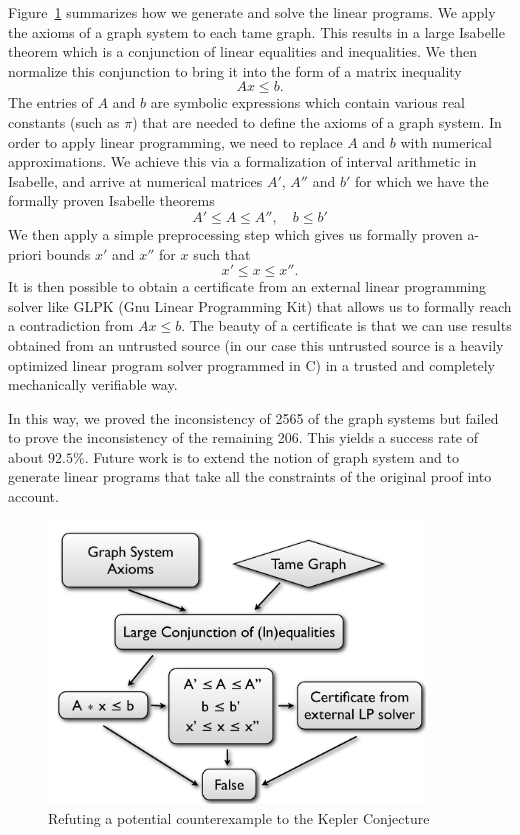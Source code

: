 \documentclass[11pt]{amsart}
\begin{document}
Figure~\ref{fig:lpapproach} summarizes how we generate and solve the linear programs.
We apply the axioms of a graph system to each tame graph. This results in a large Isabelle theorem which is a conjunction of
linear equalities and inequalities. We then normalize this conjunction
to bring it into the form of a matrix inequality
\begin{equation}
A  x \leq b.
\end{equation}
The entries of $A$ and $b$ are symbolic expressions which contain various real constants (such as $\pi$) that are needed to
define the axioms of a graph system. In order to apply linear programming, 
we need to replace $A$ and $b$ with numerical approximations. We achieve this via a formalization of 
interval arithmetic in Isabelle, and arrive at numerical matrices $A'$, $A''$ and $b'$ for which we have the formally proven 
Isabelle theorems 
\begin{equation}
A' \leq  A  \leq A'', \quad b \leq b'
\end{equation}
We then apply a simple preprocessing step which gives us formally proven a-priori bounds $x'$ and $x''$ for $x$ such
that 
\begin{equation}
x' \leq x \leq x''.
\end{equation}
It is then possible to obtain a certificate from an external linear programming solver like GLPK (Gnu Linear Programming Kit) that allows us to formally reach a contradiction from $A x \leq b$. The beauty of a certificate is 
that we can use results obtained from an untrusted source (in our case this untrusted source is a 
heavily optimized linear program solver programmed in C) in a trusted and completely mechanically verifiable way.

In this way, we proved the inconsistency of 2565 of the graph systems but failed to prove the inconsistency of the remaining 206. 
This yields a success rate of about $92.5\%$. Future work is to extend the notion of graph system and to generate linear programs
that take all the constraints of the original proof into account.


\begin{figure}
\begin{center}
\includegraphics[width=10cm]{lpapproach}
\end{center}
\caption{Refuting a potential counterexample to the Kepler Conjecture}
\label{fig:lpapproach}
\end{figure}
\end{document}
